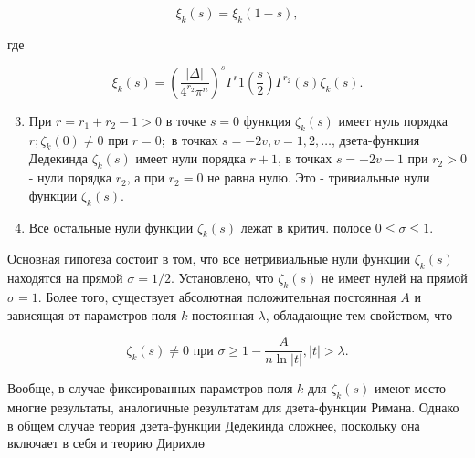 \documentclass[10pt]{article}
\begin{document}
\[

\xi_{k}(s)=\xi_{k}(1-s),

\]



где



\[

\xi_{k}(s)=\left(\frac{|\Delta|}{4^{r_{2}} \pi^{n}}\right)^{s} \Gamma^{r} 1\left(\frac{s}{2}\right) \Gamma^{r_{2}}(s) \zeta_{k}(s) .

\]



\begin{enumerate}

  \setcounter{enumi}{2}

  \item При $r=r_{1}+r_{2}-1>0$ в точке $s=0$ функция $\zeta_{k}(s)$ имеет нуль порядка $r ; \zeta_{k}(0) \neq 0$ при $r=0 ;$ в точках $s=-2 v, v=1,2, \ldots$, дзета-функция Дедекинда $\zeta_{k}(s)$ имеет нули порядка $r+1$, в точках $s=-2 v-1$ при $r_{2}>0$ - нули порядка $r_{2}$, а при $r_{2}=0$ не равна нулю. Это - тривиальные нули функции $\zeta_{k}(s)$.



  \item Все остальные нули функции $\zeta_{k}(s)$ лежат в критич. полосе $0 \leqslant \sigma \leqslant 1$.



\end{enumerate}



Основная гипотеза состоит в том, что все нетривиальные нули функции $\zeta_{k}(s)$ находятся на прямой $\sigma=1 / 2$. Установлено, что $\zeta_{k}(s)$ не имеет нулей на прямой $\sigma=1$. Более того, существует абсолютная положительная постоянная $A$ и зависящая от параметров поля $k$ постоянная $\lambda$, обладающие тем свойством, что



\[

\zeta_{k}(s) \neq 0 \text { при } \sigma \geqslant 1-\frac{A}{n \ln |t|},|t|>\lambda .

\]



Вообще, в случае фиксированных параметров поля $k$ для $\zeta_{k}(s)$ имеют место многие результаты, аналогичные результатам для дзета-функции Римана. Однако в общем случае теория дзета-функции Дедекинда сложнее, поскольку она включает в себя и теорию Дирихлө
\end{document}
